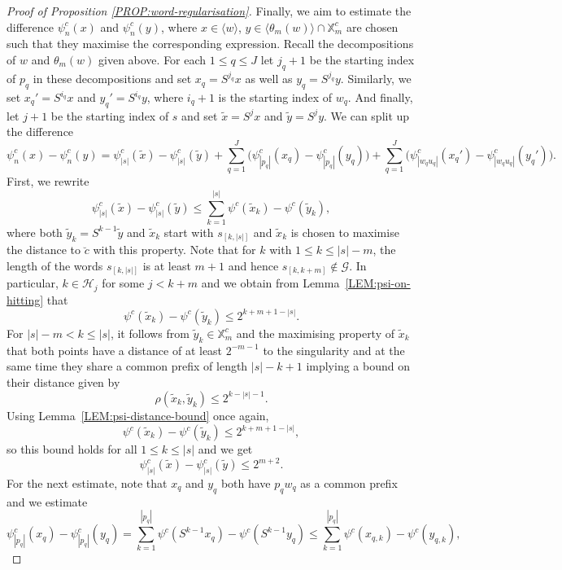 \documentclass[11pt,reqno]{amsart}
\theoremstyle{plain}
\theoremstyle{definition}
\newcommand{\mc}{\mathcal}
\begin{document}
\begin{proof}[Proof of Proposition \ref{PROP:word-regularisation}]
Finally, we aim to estimate the difference $\psi_n^c(x)$ and $\psi_n^c(y)$, where $x \in \langle w \rangle$, $y \in \langle \theta_m(w) \rangle \cap \mathbb{X}_{m}^c$ are chosen such that they maximise the corresponding expression. 
Recall the decompositions of $w$ and $\theta_m(w)$ given above.
For each $1\leqslant q \leqslant J$ let $j_q +1$ be the starting index of $p_q$ in these decompositions and set $x_q = S^{j_q}x$ as well as $y_q = S^{j_q}y$. Similarly, we set $x_q' = S^{i_q}x$ and $y_q' = S^{i_q}y$, where $i_q + 1$ is the starting index of $w_q$. And finally, let $j+1$ be the starting index of $s$ and set $\widetilde{x} = S^j x$ and $\widetilde{y} = S^j y$.
We can split up the difference
\[
\psi^c_n(x) - \psi^c_n(y)
= \psi^c_{|s|}(\widetilde{x}) - \psi^c_{|s|}(\widetilde{y}) + \sum_{q=1}^J \bigl( \psi^c_{|p_q|} (x_q) - \psi^c_{|p_q|}(y_q) \bigr)
+ \sum_{q=1}^J \bigl( \psi^c_{|w_q u_q|} (x_q') - \psi^c_{|w_q u_q|} (y_q') \bigr).
\]
First, we rewrite
\[
\psi^c_{|s|}( \widetilde{x}) - \psi^c_{|s|}( \widetilde{y}) \leqslant \sum_{k=1}^{|s|} \psi^c(\widetilde{x}_k) - \psi^c( \widetilde{y}_k),
\]
where both $ \widetilde{y}_k = S^{k-1}\widetilde{y}$ and $\widetilde{x}_k$ start with $s_{[k,|s|]}$ and $\widetilde{x}_k$ is chosen to maximise the distance to $\breve{c}$ with this property.
Note that for $k$ with $1\leqslant k \leqslant |s| - m$, the length of the words $s_{[k,|s|]}$ is at least $m+1$ and hence $s_{[k,k+m]} \notin \mc G$. In particular, $k \in \mc H_{j}$ for some $j < k+m$ and we obtain from Lemma~\ref{LEM:psi-on-hitting} that
\[
\psi^c(\widetilde{x}_k) - \psi^c( \widetilde{y}_k) \leqslant 2^{k+m +1- |s|}.
\]
For $|s|-m < k \leqslant |s|$, it follows from $\widetilde{y}_k \in \mathbb{X}^c_m$ and the maximising property of $\widetilde{x}_k$ that both points have a distance of at least $2^{-m-1}$ to the singularity and at the same time they share a common prefix of length $|s| - k + 1$ implying a bound on their distance given by
\[
\rho(\widetilde{x}_k,\widetilde{y}_k) \leqslant 2^{k - |s| - 1}.
\]
Using Lemma~\ref{LEM:psi-distance-bound} once again,
\[
\psi^c(\widetilde{x}_k) - \psi^c(\widetilde{y}_k) \leqslant 2^{k+m+1- |s|},
\]
so this bound holds for all $1\leqslant k \leqslant |s|$ and we get 
\[
\psi^c_{|s|}( \widetilde{x}) - \psi^c_{|s|}(\widetilde{y}) \leqslant 2^{m+2}.
\]
For the next estimate, note that $x_q$ and $y_q$ both have $p_q w_q$ as a common prefix and we estimate
\[
\psi^c_{|p_q|} (x_q) - \psi^c_{|p_q|}(y_q)
= \sum_{k=1}^{|p_q|} \psi^c(S^{k-1} x_q) - \psi^c(S^{k-1} y_q)
\leqslant \sum_{k=1}^{|p_q|} \psi^c(x_{q,k}) - \psi^c(y_{q,k}),
\]
\end{proof}
\end{document}
